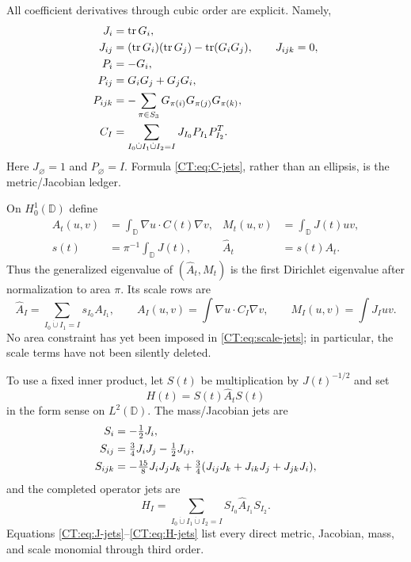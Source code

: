 All coefficient derivatives through cubic order are explicit.  Namely,
\begin{align}
 J_i&=\operatorname {tr}G_i,\notag\\
 J_{ij}&=(\operatorname {tr}G_i)(\operatorname {tr}G_j)
          -\operatorname {tr}(G_iG_j),\qquad J_{ijk}=0,
 \label{CT:eq:J-jets}\\
 P_i&=-G_i,\notag\\
 P_{ij}&=G_iG_j+G_jG_i,\notag\\
 P_{ijk}&=-\sum_{\pi\in S_3}
 G_{\pi(i)}G_{\pi(j)}G_{\pi(k)},
 \label{CT:eq:P-jets}\\
 C_I&=\sum_{I_0\dot\cup I_1\dot\cup I_2=I}
 J_{I_0}P_{I_1}P_{I_2}^{T}.
 \label{CT:eq:C-jets}
\end{align}
Here $J_\varnothing=1$ and $P_\varnothing=I$.  Formula
\eqref{CT:eq:C-jets}, rather than an ellipsis, is the metric/Jacobian ledger.

On $H_0^1(\mathbb D)$ define
\begin{align}
 A_t(u,v)&=\int_{\mathbb D}\nabla u\cdot C(t)\nabla v,
 &M_t(u,v)&=\int_{\mathbb D}J(t)uv,\label{CT:eq:forms}\\
 s(t)&=\pi^{-1}\int_{\mathbb D}J(t),
 &\widehat A_t&=s(t)A_t.\label{CT:eq:scale-form}
\end{align}
Thus the generalized eigenvalue of $(\widehat A_t,M_t)$ is the first
Dirichlet eigenvalue after normalization to area $\pi$.  Its scale rows are
\begin{equation}\label{CT:eq:scale-jets}
 \widehat A_I
 =\sum_{I_0\dot\cup I_1=I}s_{I_0}A_{I_1},
 \qquad
 A_I(u,v)=\int\nabla u\cdot C_I\nabla v,
 \qquad M_I(u,v)=\int J_Iuv.
\end{equation}
No area constraint has yet been imposed in \eqref{CT:eq:scale-jets}; in
particular, the scale terms have not been silently deleted.

To use a fixed inner product, let $S(t)$ be multiplication by
$J(t)^{-1/2}$ and set
\begin{equation}\label{CT:eq:H}
 H(t)=S(t)\widehat A_tS(t)
\end{equation}
in the form sense on $L^2(\mathbb D)$.  The mass/Jacobian jets are
\begin{align}
 S_i&=-\tfrac12J_i,\notag\\
 S_{ij}&=\tfrac34J_iJ_j-\tfrac12J_{ij},\notag\\
 S_{ijk}&=-\tfrac{15}{8}J_iJ_jJ_k
 +\tfrac34(J_{ij}J_k+J_{ik}J_j+J_{jk}J_i),
 \label{CT:eq:S-jets}
\end{align}
and the completed operator jets are
\begin{equation}\label{CT:eq:H-jets}
 H_I=\sum_{I_0\dot\cup I_1\dot\cup I_2=I}
 S_{I_0}\widehat A_{I_1}S_{I_2}.
\end{equation}
Equations \eqref{CT:eq:J-jets}--\eqref{CT:eq:H-jets} list every direct metric,
Jacobian, mass, and scale monomial through third order.

